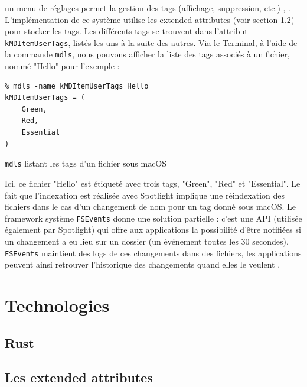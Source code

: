 \documentclass[a4paper, 12pt]{article}
\newenvironment{code}{\captionsetup{type=listing}}{}
\begin{document}
un menu de réglages permet la gestion des tags (affichage, suppression, etc.) \cite{ref5}, 
\cite{ref6}. L'implémentation de ce système utilise les extended attributes (voir section 
\ref{extended_attributes}) pour stocker les tags. Les différents tags se trouvent dans l'attribut 
\texttt{kMDItemUserTags}, listés les uns à la suite des autres. Via le Terminal, à 
l'aide de la commande \texttt{mdls}, nous pouvons afficher la liste des tags associés à 
un fichier, nommé "Hello" pour l'exemple :
\begin{code}
    \begin{verbatim}
% mdls -name kMDItemUserTags Hello 
kMDItemUserTags = (
    Green,
    Red,
    Essential
)
    \end{verbatim}
    \caption{\texttt{mdls} listant les tags d'un fichier sous macOS \cite{ref7}}
\end{code}
\bigbreak
Ici, ce fichier "Hello" est étiqueté avec trois tags, "Green", "Red" et "Essential". Le fait que 
l'indexation est réalisée avec Spotlight implique une réindexation des fichiers dans le cas d'un 
changement de nom pour un tag donné sous macOS. Le framework système \texttt{FSEvents} 
donne une solution partielle : c'est une API (utilisée également par Spotlight) qui offre aux 
applications la possibilité d'être notifiées si un changement a eu lieu sur un dossier (un événement 
toutes les 30 secondes). \texttt{FSEvents} maintient des logs de ces changements dans 
des fichiers, les applications peuvent ainsi retrouver l'historique des changements quand elles 
le veulent \cite{ref10}.



\section{Technologies} %
\subsection{Rust}
\cite{ref0} \cite{ref1} \cite{ref2}

\subsection{Les extended attributes}\label{extended_attributes}
\end{document}
